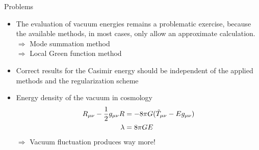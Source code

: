 \documentclass{beamer}
\begin{document}
\begin{frame}{Problems}
    \begin{itemize}
        \item The evaluation of vacuum energies remains a problematic exercise, because the available methods, in most cases, only allow an approximate calculation.\\
    $\Rightarrow$ Mode summation method\\
    $\Rightarrow$ Local Green function method
    \item Correct results for the Casimir energy should be independent of the applied methods and the regularization scheme
    \item Energy density of the vacuum in cosmology
    \begin{equation*}
    \begin{split}
        R_{\mu\nu}-\frac{1}{2}g_{\mu\nu}R&=-8\pi G(\Tilde{T}_{\mu\nu}-{E}g_{\mu\nu}) \\
        \lambda&=8\pi G{E}
    \end{split}
    \end{equation*}
    $\Rightarrow$ Vacuum fluctuation produces way more!
    \end{itemize}
\end{frame}
\end{document}
